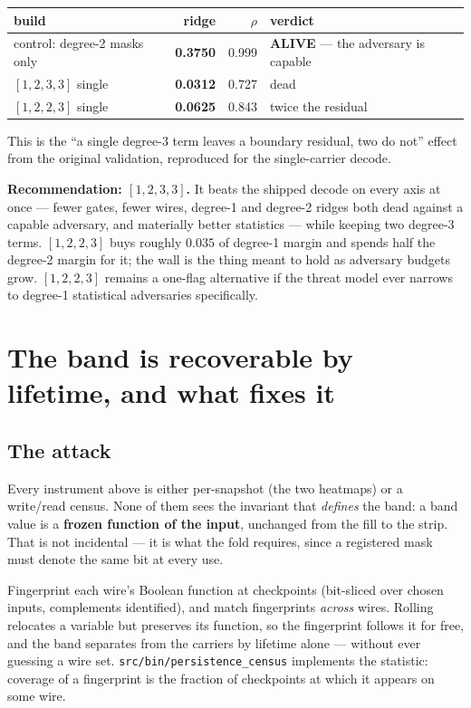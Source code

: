 \documentclass[11pt]{article}
\newcommand{\code}[1]{\texttt{#1}}
\begin{document}
\begin{center}
\begin{tabular}{lrrl}
\toprule
build & ridge & $\rho$ & verdict \\
\midrule
control: degree-2 masks only & \textbf{0.3750} & 0.999 & \textbf{ALIVE} --- the adversary is capable \\
$[1,2,3,3]$ single & \textbf{0.0312} & 0.727 & dead \\
$[1,2,2,3]$ single & \textbf{0.0625} & 0.843 & twice the residual \\
\bottomrule
\end{tabular}
\end{center}

This is the ``a single degree-3 term leaves a boundary residual, two do not''
effect from the original validation, reproduced for the single-carrier decode.

\textbf{Recommendation: $[1,2,3,3]$.} It beats the shipped decode on every axis
at once --- fewer gates, fewer wires, degree-1 and degree-2 ridges both dead
against a capable adversary, and materially better statistics --- while keeping
two degree-3 terms. $[1,2,2,3]$ buys roughly $0.035$ of degree-1 margin and
spends half the degree-2 margin for it; the wall is the thing meant to hold as
adversary budgets grow. $[1,2,2,3]$ remains a one-flag alternative if the
threat model ever narrows to degree-1 statistical adversaries specifically.

\section{The band is recoverable by lifetime, and what fixes it}
\label{sec:persist}

\subsection{The attack}

Every instrument above is either per-snapshot (the two heatmaps) or a
write/read census. None of them sees the invariant that \emph{defines} the
band: a band value is a \textbf{frozen function of the input}, unchanged from
the fill to the strip. That is not incidental --- it is what the fold requires,
since a registered mask must denote the same bit at every use.

Fingerprint each wire's Boolean function at checkpoints (bit-sliced over chosen
inputs, complements identified), and match fingerprints \emph{across} wires.
Rolling relocates a variable but preserves its function, so the fingerprint
follows it for free, and the band separates from the carriers by lifetime
alone --- without ever guessing a wire set. \code{src/bin/persistence\_census}
implements the statistic: coverage of a fingerprint is the fraction of
checkpoints at which it appears on some wire.
\end{document}
